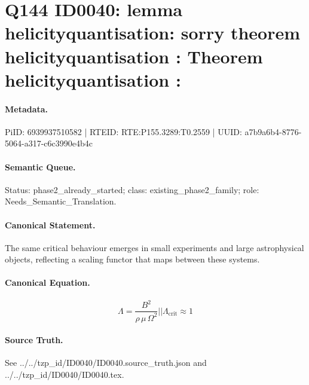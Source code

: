\section*{Q144 ID0040: lemma helicityquantisation: sorry theorem helicityquantisation : Theorem helicityquantisation :}
\paragraph{Metadata.}
PiID: 6939937510582 | RTEID: RTE:P155.3289:T0.2559 | UUID: a7b9a6b4-8776-5064-a317-c6c3990e4b4c

\paragraph{Semantic Queue.}
Status: phase2\_already\_started; class: existing\_phase2\_family; role: Needs\_Semantic\_Translation.

\paragraph{Canonical Statement.}
The same critical behaviour emerges in small experiments and large astrophysical objects, reflecting a scaling functor that maps between these systems.

\paragraph{Canonical Equation.}
\[
\Lambda = \frac{B^{2}}{\rho\,\mu\,\Omega^{2}} || \Lambda_{\mathrm{crit}} \approx 1
\]

\paragraph{Source Truth.}
See ../../tzp\_id/ID0040/ID0040.source\_truth.json and ../../tzp\_id/ID0040/ID0040.tex.

